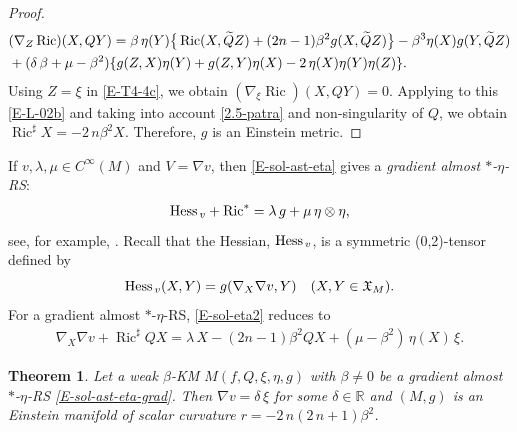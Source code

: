 \documentclass[11pt,a4paper,twoside]{article}
\newtheorem{theorem}{Theorem}%
\def\Ric{\operatorname{Ric}}
\begin{document}
{\begin{proof}
\begin{align}\label{E-T4-4c}
\notag
 & (\nabla_Z\Ric)(X,QY) = \beta\,\eta(Y)\big\{\Ric(X,\widetilde Q Z) + (2n-1)\beta^2 g(X,\widetilde Q Z)\big\}
 - \beta^3\eta(X) g(Y,\widetilde Q Z)\\
 & + (\delta\,\beta+\mu-\beta^2)\{ g(Z,X)\eta(Y) + g(Z,Y)\eta(X) - 2\,\eta(X)\eta(Y)\eta(Z)\} .
\end{align}
Using $Z=\xi$ in \eqref{E-T4-4c}, we obtain $(\nabla_\xi\Ric)(X,QY)=0$.
Applying to this \eqref{E-L-02b} and taking into account \eqref{2.5-patra} and non-singularity of $Q$, we obtain $\Ric^\sharp X=-2\,n\beta^2 X$.
Therefore, $g$ is an Einstein metric.
\end{proof}

If $v,\lambda,\mu\in C^\infty(M)$ and $V=\nabla v$, then \eqref{E-sol-ast-eta} gives a \textit{gradient almost $\ast$-$\eta$-RS}:
\begin{align}\label{E-sol-ast-eta-grad}
 {\rm Hess}_{\,v} +\Ric^\ast=\lambda\,g +\mu\,\eta\otimes\eta ,
\end{align}
see, for example, \cite{DeyRoy-2020,DSB-2024,ven-2022}.
Recall that the Hessian, ${\rm Hess}_{\,v}$, is a symmetric (0,2)-tensor defined by
\[
 {\rm Hess}_{\,v}(X,Y) = g(\nabla_X\nabla v, Y)\quad (X,Y\in\mathfrak{X}_M).
\]
For a gradient almost $\ast$-$\eta$-RS, \eqref{E-sol-eta2} reduces to
\begin{align}\label{E-sol-eta2-grad}
 \nabla_X\nabla v + \Ric^\sharp QX = \lambda\,X - (2n-1)\beta^2 QX + (\mu-\beta^2)\,\eta(X)\,\xi .
\end{align}

\begin{theorem}\label{T-005}
Let a weak $\beta$-KM $M({f},Q,\xi,\eta,g)$ with $\beta\ne0$ be a gradient almost $\ast$-$\eta$-RS \eqref{E-sol-ast-eta-grad}.
Then $\nabla v=\delta\,\xi$ for some $\delta\in\mathbb{R}$ and
$(M, g)$ is an Einstein manifold of scalar curvature ${r}=-2\,n(2\,n+1)\beta^2$.
\end{theorem}

}
\end{document}
